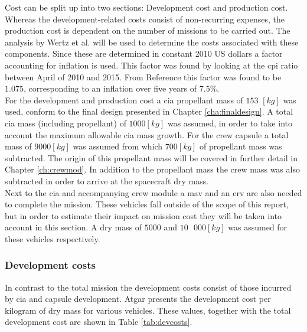 Cost can be split up into two sections: Development cost and production cost. Whereas the development-related costs consist of non-recurring expenses, the production cost is dependent on the number of missions to be carried out. The analysis by Wertz et al. \cite{Wertz2011} will be used to determine the costs associated with these components. Since these are determined in constant 2010 US dollars a factor accounting for inflation is used. This factor was found by looking at the \gls{cpi} ratio between April of 2010 and 2015. From Reference \cite{Crawford2015} this factor was found to be $1.075$, corresponding to an inflation over five years of $7.5\%$.\\
For the development and production cost a \gls{cia} propellant mass of $153$ $\left[kg\right]$ was used, conform to the final design presented in Chapter \ref{cha:finaldesign}. A total \gls{cia} mass (including propellant) of $1000 \left[kg\right]$ was assumed, in order to take into account the maximum allowable \gls{cia} mass growth. For the crew capsule a total mass of $9000 \left[kg\right]$ was assumed from which $700 \left[kg\right]$ of propellant mass was subtracted. The origin of this propellant mass will be covered in further detail in Chapter \ref{ch:crewmod}. In addition to the propellant mass the crew mass was also subtracted in order to arrive at the spacecraft dry mass.\\
Next to the \gls{cia} and accompanying crew module a \gls{mav} and an \gls{erv} are also needed to complete the mission. These vehicles fall outside of the scope of this report, but in order to estimate their impact on mission cost they will be taken into account in this section. A dry mass of $5000$ and $10\mbox{ }000 \left[kg\right]$ was assumed for these vehicles respectively.

\subsubsection{Development costs}
In contrast to the total mission the development costs consist of those incurred by \gls{cia} and capsule development. Atgar \cite[p.296]{Wertz2011} presents the development cost per kilogram of dry mass for various vehicles. These values, together with the total development cost are shown in Table \ref{tab:devcosts}.

